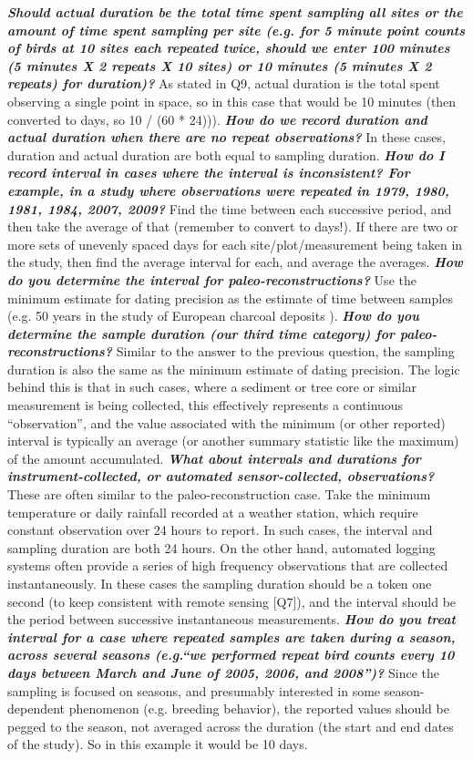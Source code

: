\documentclass[12pt]{article}
\begin{document}
\begin{enumerate}
  \Hitem \emph{\textbf{Should actual duration be the total time spent sampling all sites or the amount of time spent sampling per site (e.g. for 5 minute point counts of birds at 10 sites each repeated twice, should we enter 100 minutes (5 minutes X 2 repeats X 10 sites) or 10 minutes (5 minutes X 2 repeats) for duration)?}} As stated in Q9, actual duration is the total spent observing a single point in space, so in this case that would be 10 minutes (then converted to days, so 10 / (60 * 24))).
  \Hitem \emph{\textbf{How do we record duration and actual duration when there are no repeat observations?}} In these cases, duration and actual duration are both equal to sampling duration. 
   \Hitem \emph{\textbf{How do I record interval in cases where the interval is inconsistent?  For example, in a study where observations were repeated in 1979, 1980, 1981, 1984, 2007, 2009?}} Find the time between each successive period, and then take the average of that (remember to convert to days!). If there are two or more sets of unevenly spaced days for each site/plot/measurement being taken in the study, then find the average interval for each, and average the averages.  
    \Hitem \emph{\textbf{How do you determine the interval for paleo-reconstructions?}} Use the minimum estimate for dating precision as the estimate of time between samples (e.g. 50 years in the study of European charcoal deposits \cite{molinari_exploring_2013}). 
    \Hitem \emph{\textbf{How do you determine the sample duration (our third time category) for paleo-reconstructions?}} Similar to the answer to the previous question, the sampling duration is also the same as the minimum estimate of dating precision. The logic behind this is that in such cases, where a sediment or tree core or similar measurement is being collected, this effectively represents a continuous ``observation'', and the value associated with the minimum (or other reported) interval is typically an average (or another summary statistic like the maximum) of the amount accumulated. 
    \Hitem \emph{\textbf{What about intervals and durations for instrument-collected, or automated sensor-collected, observations?}} These are often similar to the paleo-reconstruction case. Take the minimum temperature or daily rainfall recorded at a weather station, which require constant observation over 24 hours to report. In such cases, the interval and sampling duration are both 24 hours. On the other hand, automated logging systems often provide a series of high frequency observations that are collected instantaneously. In these cases the sampling duration should be a token one second (to keep consistent with remote sensing [Q7]), and the interval should be the period between successive instantaneous measurements. 
    \Hitem \emph{\textbf{How do you treat interval for a case where repeated samples are taken during a season, across several seasons (e.g.``we performed repeat bird counts every 10 days between March and June of 2005, 2006, and 2008'')?}} Since the sampling is focused on seasons, and presumably interested in some season-dependent phenomenon (e.g. breeding behavior), the reported values should be pegged to the season, not averaged across the duration (the start and end dates of the study). So in this example it would be 10 days.  


\end{enumerate}
\end{document}
